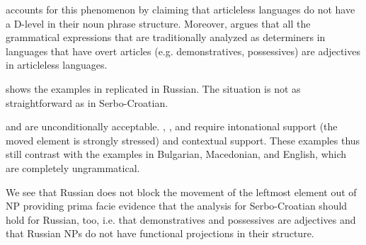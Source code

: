 \documentclass[output=paper,
colorlinks,
citecolor=brown,
newtxmath
]{langscibook}
\begin{document}
\noindent \citet{Boskovic2005a} accounts for this phenomenon by claiming that articleless languages do not have a D-level in their noun phrase structure. Moreover, \citeauthor{Boskovic2005a} argues that all the grammatical expressions that are traditionally analyzed as determiners in languages that have overt articles (e.g. demonstratives, possessives) are adjectives in articleless languages.

 shows the examples in  replicated in Russian. The situation is not as straightforward as in Serbo-Croatian.


\ea\label{Russian}      %
\z\z

\noindent {} and  are unconditionally acceptable. , , and  require intonational support (the moved element is strongly stressed) and contextual support. These examples thus still contrast with the examples in Bulgarian, Macedonian, and English, which are completely ungrammatical. 

We see that Russian does not block the movement of the leftmost element out of NP providing prima facie evidence that the analysis for Serbo-Croatian should hold for Russian, too, i.e. that demonstratives and possessives are adjectives and that Russian NPs do not have functional projections in their structure.
\end{document}
